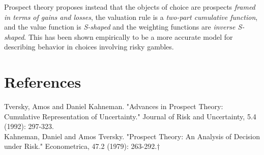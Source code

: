 \documentclass[a4paper,12pt]{article}
\numberwithin{equation}{section}
\theoremstyle{definition}
\begin{document}
Prospect theory proposes instead that the objects of choice are prospects \textit{framed in terms of gains and losses}, the valuation rule is a \textit{two-part cumulative function}, and the value function is \textit{S-shaped} and the weighting functions are \textit{inverse S-shaped}. This has been shown empirically to be a more accurate model for describing behavior in choices involving risky gambles.
\\

\section{References}
\noindent
\hangindent=0.7cm
Tversky, Amos and Daniel Kahneman. "Advances in Prospect Theory: Cumulative Representation of Uncertainty." Journal of Risk and Uncertainty, 5.4 (1992): 297-323.\\

\noindent
\hangindent=0.7cm
Kahneman, Daniel and Amos Tversky. "Prospect Theory: An Analysis of Decision under Risk." Econometrica, 47.2 (1979): 263-292.†\\
\end{document}
